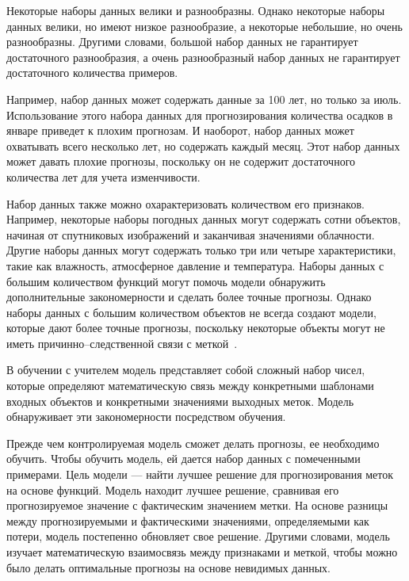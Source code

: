 Некоторые наборы данных велики и разнообразны.
Однако некоторые наборы данных велики, но имеют низкое разнообразие, а некоторые небольшие, но очень разнообразны.
Другими словами, большой набор данных не гарантирует достаточного разнообразия, а очень разнообразный набор данных не гарантирует достаточного количества примеров.

Например, набор данных может содержать данные за 100 лет, но только за июль.
Использование этого набора данных для прогнозирования количества осадков в январе приведет к плохим прогнозам.
И наоборот, набор данных может охватывать всего несколько лет, но содержать каждый месяц.
Этот набор данных может давать плохие прогнозы, поскольку он не содержит достаточного количества лет для учета изменчивости.

Набор данных также можно охарактеризовать количеством его признаков.
Например, некоторые наборы погодных данных могут содержать сотни объектов, начиная от спутниковых изображений и заканчивая значениями облачности.
Другие наборы данных могут содержать только три или четыре характеристики, такие как влажность, атмосферное давление и температура.
Наборы данных с большим количеством функций могут помочь модели обнаружить дополнительные закономерности и сделать более точные
прогнозы.
Однако наборы данных с большим количеством объектов не всегда создают модели, которые дают более точные прогнозы, поскольку некоторые объекты могут не иметь причинно--следственной связи с меткой~\cite{google1}.


В обучении с учителем модель представляет собой сложный набор чисел, которые определяют математическую связь между конкретными шаблонами входных объектов и конкретными значениями выходных меток.
Модель обнаруживает эти закономерности посредством обучения.


Прежде чем контролируемая модель сможет делать прогнозы, ее необходимо обучить.
Чтобы обучить модель, ей дается набор данных с помеченными примерами.
Цель модели --- найти лучшее решение для прогнозирования меток на основе функций.
Модель находит лучшее решение, сравнивая его прогнозируемое значение с фактическим значением метки.
На основе разницы между прогнозируемыми и фактическими значениями, определяемыми как потери, модель постепенно обновляет свое решение.
Другими словами, модель изучает математическую взаимосвязь между признаками и меткой, чтобы можно было делать оптимальные прогнозы на основе невидимых данных.

